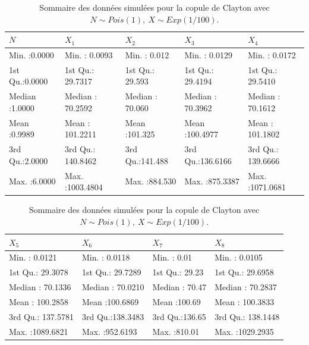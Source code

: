 \documentclass{article}
\begin{document}
	\begin{table}[H]
		\centering
		\begin{tabular}{lllll}
			\hline
			       $N$ &      $X_1$ &      $X_2$ &       $X_3$ &       $X_4$ \\
			\hline
			 Min.   :0.0000   & Min.   :   0.0093   & Min.   :  0.012   & Min.   :  0.0129   & Min.   :   0.0172 \\
			 1st Qu.:0.0000   & 1st Qu.:  29.7317   & 1st Qu.: 29.593   & 1st Qu.: 29.4194   & 1st Qu.:  29.5410 \\
			 Median :1.0000   & Median :  70.2592   & Median : 70.060   & Median : 70.3962   & Median :  70.1612 \\
			 Mean   :0.9989   & Mean   : 101.2211   & Mean   :101.325   & Mean   :100.4977   & Mean   : 101.1802 \\
			 3rd Qu.:2.0000   & 3rd Qu.: 140.8462   & 3rd Qu.:141.488   & 3rd Qu.:136.6166   & 3rd Qu.: 139.6666 \\
			 Max.   :6.0000   & Max.   :1003.4804   & Max.   :884.530   & Max.   :875.3387   & Max.   :1071.0681 \\
			\hline
		\end{tabular}

		\begin{tabular}{llll}
			\hline
			$X_5$ &      $X_6$ &       $X_7$ &       $X_8$ \\ 
			\hline
			Min.   :   0.0121   & Min.   :  0.0118   & Min.   :  0.01   & Min.   :   0.0105   \\ 
			1st Qu.:  29.3078   & 1st Qu.: 29.7289   & 1st Qu.: 29.23   & 1st Qu.:  29.6958   \\ 
			Median :  70.1336   & Median : 70.0210   & Median : 70.47   & Median :  70.2837   \\ 
			Mean   : 100.2858   & Mean   :100.6869   & Mean   :100.69   & Mean   : 100.3833   \\ 
			3rd Qu.: 137.5781   & 3rd Qu.:138.3483   & 3rd Qu.:136.65   & 3rd Qu.: 138.1448   \\ 
			Max.   :1089.6821   & Max.   :952.6193   & Max.   :810.01   & Max.   :1029.2935   \\ 
			\hline
	\end{tabular}
	\caption[Sommaire des données simulées pour la copule de Clayton avec une loi de fréquence Poisson.]{Sommaire des données simulées pour la copule de Clayton avec $N \sim Pois(1),\ X\sim Exp(1/100)$.}\label{tbl_sommaire_Clayton_Pois_1}
	\end{table}
\end{document}
